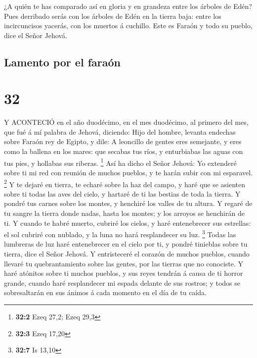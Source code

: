  ¿A quién te has comparado así en gloria y en grandeza
entre los árboles de Edén? Pues derribado serás con los árboles de Edén
en la tierra baja: entre los incircuncisos yacerás, con los muertos á
cuchillo. Este es Faraón y todo su pueblo, dice el Señor Jehová.

\hypertarget{lamento-por-el-farauxf3n}{%
\subsection{Lamento por el faraón}\label{lamento-por-el-farauxf3n}}

\hypertarget{section-31}{%
\section{32}\label{section-31}}

 Y ACONTECIÓ en el año duodécimo, en el mes duodécimo, al
primero del mes, que fué á mí palabra de Jehová, diciendo: 
Hijo del hombre, levanta endechas sobre Faraón rey de Egipto, y dile: A
leoncillo de gentes eres semejante, y eres como la ballena en los mares:
que secabas tus ríos, y enturbiabas las aguas con tus pies, y hollabas
sus riberas. \footnote{\textbf{32:2} Ezeq 27,2; Ezeq 29,3} 
Así ha dicho el Señor Jehová: Yo extenderé sobre ti mi red con reunión
de muchos pueblos, y te harán subir con mi esparavel. \footnote{\textbf{32:3}
  Ezeq 17,20}  Y te dejaré en tierra, te echaré sobre la haz
del campo, y haré que se asienten sobre ti todas las aves del cielo, y
hartaré de ti las bestias de toda la tierra.  Y pondré tus
carnes sobre los montes, y henchiré los valles de tu altura.
 Y regaré de tu sangre la tierra donde nadas, hasta los
montes; y los arroyos se henchirán de ti.  Y cuando te habré
muerto, cubriré los cielos, y haré entenebrecer sus estrellas: el sol
cubriré con nublado, y la luna no hará resplandecer su luz. \footnote{\textbf{32:7}
  Is 13,10}  Todas las lumbreras de luz haré entenebrecer en
el cielo por ti, y pondré tinieblas sobre tu tierra, dice el Señor
Jehová.  Y entristeceré el corazón de muchos pueblos, cuando
llevaré tu quebrantamiento sobre las gentes, por las tierras que no
conociste.  Y haré atónitos sobre ti muchos pueblos, y sus
reyes tendrán á causa de ti horror grande, cuando haré resplandecer mi
espada delante de sus rostros; y todos se sobresaltarán en sus ánimos á
cada momento en el día de tu caída.

